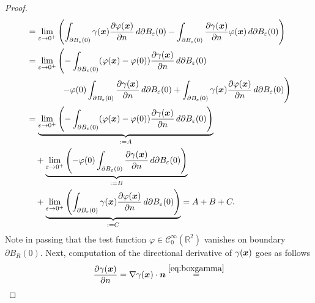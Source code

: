 \documentclass[12pt]{article}
\begin{document}
\begin{proof}
\begin{align}
		 & = \lim_{\varepsilon\to 0^+}
		\left(
		\int_{\partial B_{\varepsilon}(0)} \gamma({\boldsymbol{\mathnormal x}})
		\frac{\partial\varphi({\boldsymbol{\mathnormal x}})}{\partial n} \, d\partial B_{\varepsilon}(0)
		- \int_{\partial B_{\varepsilon}(0)}
		\frac{\partial\gamma({\boldsymbol{\mathnormal x}})}{\partial n} \varphi({\boldsymbol{\mathnormal x}}) \, d\partial B_{\varepsilon}(0)
		\right)                                                                              \notag \\
		 & = \lim_{\varepsilon\to 0^+}
		\left(
		-
		\int_{\partial B_\varepsilon(0)} (\varphi({\boldsymbol{\mathnormal x}})-\varphi(0))
		\frac{\partial\gamma({\boldsymbol{\mathnormal x}})}{\partial n}\, d\partial B_{\varepsilon}(0) \right.        \notag \\
		 & \quad\quad\quad\quad
		\left.
		-\varphi(0)\int_{\partial B_\varepsilon(0)}
		\frac{\partial\gamma({\boldsymbol{\mathnormal x}})}{\partial n}\, d\partial B_{\varepsilon}(0)
		+\int_{\partial B_\varepsilon(0)} \gamma({\boldsymbol{\mathnormal x}})
		\frac{\partial\varphi({\boldsymbol{\mathnormal x}})}{\partial n}\, d\partial B_{\varepsilon}(0)
		\right)                                                                              \notag \\
		 & = \underbrace{\lim_{\varepsilon\to 0^+}
			\left(
			-
			\int_{\partial B_\varepsilon(0)} (\varphi({\boldsymbol{\mathnormal x}})-\varphi(0))
			\frac{\partial\gamma({\boldsymbol{\mathnormal x}})}{\partial n}\, d\partial B_{\varepsilon}(0) \right)}_{:=A} \notag \\
		 & \quad + 
		\underbrace{\lim_{\varepsilon\to 0^+}
			\left(
			-\varphi(0)\int_{\partial B_\varepsilon(0)}
			\frac{\partial\gamma({\boldsymbol{\mathnormal x}})}{\partial n}\, d\partial B_{\varepsilon}(0) \right)}_{:=B} \notag \\
		 & \quad + 
		\underbrace{\lim_{\varepsilon\to 0^+}
			\left(
			\int_{\partial B_\varepsilon(0)} \gamma({\boldsymbol{\mathnormal x}})
			\frac{\partial\varphi({\boldsymbol{\mathnormal x}})}{\partial n}\, d\partial B_{\varepsilon}(0)
			\right)}_{:=C} = A+B+C.
	\end{align}
	Note in passing that the test function 
	$\varphi \in \mathcal{C}^{\infty}_{0}(\mathbb{R}^2)$ vanishes on boundary $\partial B_R(0)$.
	Next, computation of the directional derivative of $\gamma({\boldsymbol{\mathnormal x}})$ goes as follows
	\begin{align*}
		\frac{\partial\gamma(\Bx)}{\partial n}
		= \nabla \gamma(\Bx) \cdot \Bn 
		\stackrel{\eqref{eq:boxgamma}}{=}

\end{align*}
\end{proof}
\end{document}
